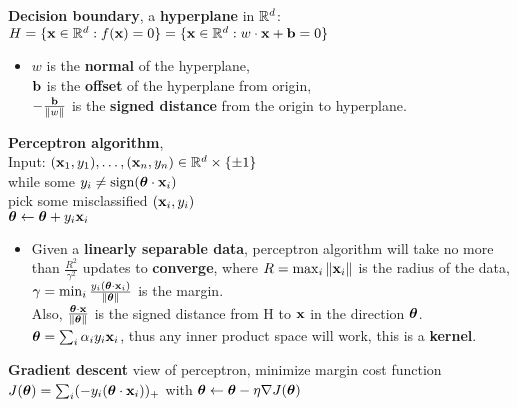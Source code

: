 \documentclass[10pt,landscape]{article}
\begin{document}
\begin{multicols*}{3}
\textbf{Decision boundary}, a \textbf{hyperplane} in $\mathbb{R}^d$: $H = \{\mathbf{x} \in \mathbb{R}^{d} : f(\mathbf{x}) = 0\} = \{\mathbf{x} \in \mathbb{R}^{d} : w \cdot \mathbf{x} + \mathbf{b} = 0\}$
	\begin{itemize}
		\item[]
		$w$ is the \textbf{normal} of the hyperplane,\\
		$\mathbf{b}$ is the \textbf{offset} of the hyperplane from origin,\\
		$-\frac{\mathbf{b}}{\|w\|}$ is the \textbf{signed distance} from the origin to hyperplane.
	\end{itemize}
\textbf{Perceptron algorithm},\\
Input: $(\mathbf{x}_1, y_1),\dots,(\mathbf{x}_n, y_n) \in \mathbb{R}^{d} \times \{\pm 1\}$\\
while some $y_i \neq \text{sign}(\boldsymbol{\theta} \cdot \mathbf{x}_i)$\\
\-\hspace{0.5cm} pick some misclassified $(\mathbf{x}_i, y_i)$\\
\-\hspace{0.5cm} $\boldsymbol{\theta} \leftarrow \boldsymbol{\theta} + y_i\mathbf{x}_i$
\begin{itemize}
	\item[]
	Given a \textbf{linearly separable data}, perceptron algorithm will take no more than $\frac{R^2}{\gamma^2}$ updates to \textbf{converge},
	where $R = \max_{i}{\|\mathbf{x}_i\|}$ is the radius of the data, $\gamma = \min_{i}{\frac{y_i(\boldsymbol{\theta}\cdot\mathbf{x}_i)}{\|\boldsymbol{\theta}\|}}$ is the margin.\\
	Also, $\frac{\boldsymbol{\theta}\cdot\mathbf{x}}{\|\boldsymbol{\theta}\|}$ is the signed distance from H to $\mathbf{x}$ in the direction $\boldsymbol{\theta}$. \\
	$\boldsymbol{\theta} = \sum_{i} \alpha_i y_i \mathbf{x}_i$, thus any inner product space will work, this is a \textbf{kernel}.
\end{itemize}

\textbf{Gradient descent} view of perceptron, minimize margin cost function
$J(\boldsymbol{\theta}) = \sum_{i}(-y_i(\boldsymbol{\theta}\cdot\mathbf{x}_i))_{+}$ with $\boldsymbol{\theta} \leftarrow \boldsymbol{\theta} - \eta\nabla J(\boldsymbol{\theta})$


\end{multicols*}
\end{document}
